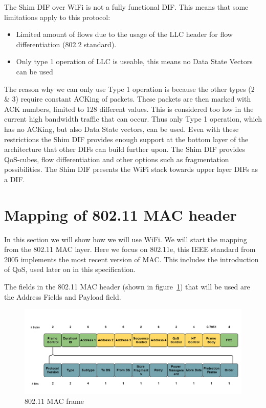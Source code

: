 The Shim DIF over WiFi is not a fully functional DIF. This means that some limitations apply to this protocol:

\begin{itemize}
	\item Limited amount of flows due to the usage of the LLC header for flow differentiation (802.2 standard\citep{ieee8022std}).
	\item Only type 1 operation of LLC is useable, this means no Data State Vectors can be used
\end{itemize}

The reason why we can only use Type 1 operation is because the other types (2 \& 3) require constant ACKing of packets. These packets are then marked with ACK numbers, limited to 128 different values. This is considered too low in the current high bandwidth traffic that can occur. Thus only Type 1 operation, which has no ACKing, but also Data State vectors, can be used. Even with these restrictions the Shim DIF provides enough support at the bottom layer of the architecture that other DIFs can build further upon. The Shim DIF provides QoS-cubes, flow differentiation and other options such as fragmentation possibilities. The Shim DIF presents the WiFi stack towards upper layer DIFs as a DIF.

\section{Mapping of 802.11 MAC header}

In this section we will show how we will use WiFi. We will start the mapping from the 802.11 MAC layer. Here we focus on 802.11e, this IEEE standard from 2005 implements the most recent version of MAC. This includes the introduction of QoS, used later on in this specification. 

\npar

The fields in the 802.11 MAC header (shown in figure~\ref{fig:80211macframe}) that will be used are the Address Fields and Payload field.

\begin{figure}[H]
    \centering
    \includegraphics[width=1\textwidth]{figures/80211macframe}
    \caption{802.11 MAC frame} 
    \label{fig:80211macframe}
\end{figure}


